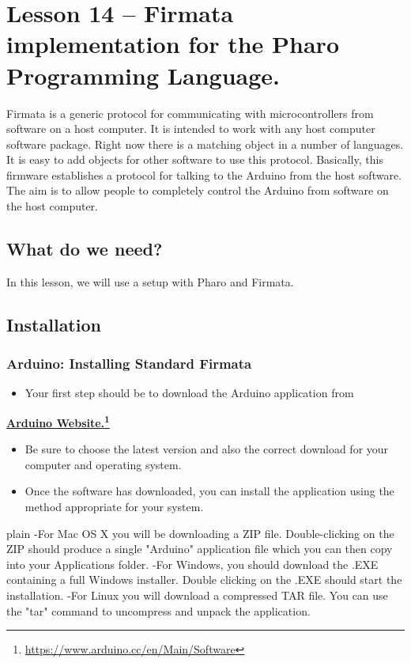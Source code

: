 \documentclass[10pt,twoside,english]{_support/latex/sbabook/sbabook}
\begin{document}
\frontmatter
\pagestyle{plain}

\tableofcontents*
\clearpage\listoffigures

\mainmatter

\chapter{Lesson 14 –  Firmata implementation for the Pharo Programming Language.}
Firmata is a generic protocol for communicating with microcontrollers from software on a host computer. 
It is intended to work with any host computer software package. Right now there is a matching object in a number of languages. 
It is easy to add objects for other software to use this protocol. 
Basically, this firmware establishes a protocol for talking to the Arduino from the host software. 
The aim is to allow people to completely control the Arduino from software on the host computer.
\section{What do we need?}
In this lesson, we will use a setup with Pharo and Firmata.
\section{Installation}\subsection{Arduino: Installing Standard Firmata}
\begin{itemize}
\item Your first step should be to download the Arduino application from 
\end{itemize}

\textbf{\href{https://www.arduino.cc/en/Main/Software}{Arduino Website.}\footnote{\url{https://www.arduino.cc/en/Main/Software}}} 

\begin{itemize}
\item Be sure to choose the latest version and also the correct download for your computer and operating system.
\item Once the software has downloaded, you can install the application using the method appropriate for your system. 
\end{itemize}

\begin{displaycode}{plain}
  -For Mac OS X you will be downloading a ZIP file. Double-clicking on the ZIP should produce a single "Arduino" application file which you can then copy into your Applications folder.
  -For Windows, you should download the .EXE containing a full Windows installer. Double clicking on the .EXE should start the installation.
  -For Linux you will download a compressed TAR file. You can use the "tar" command to uncompress and unpack the application.
\end{displaycode}
\end{document}
